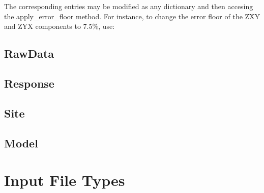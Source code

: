 \documentclass[letterpaper,10pt,english]{sphinxmanual}
\begin{document}
The corresponding entries may be modified as any dictionary and then accesing the apply\_error\_floor method. For instance, to change the error floor of the ZXY and ZYX components to 7.5\%, use:

\begin{sphinxVerbatim}[commandchars=\\\{\}]
\PYG{p}{[}\PYG{p}{]}  
\end{sphinxVerbatim}


\subsection{RawData}
\label{\detokenize{content/api_core/data_structures:rawdata}}\label{\detokenize{content/api_core/data_structures:id4}}

\subsection{Response}
\label{\detokenize{content/api_core/data_structures:response}}\label{\detokenize{content/api_core/data_structures:id5}}

\subsection{Site}
\label{\detokenize{content/api_core/data_structures:site}}\label{\detokenize{content/api_core/data_structures:id6}}

\subsection{Model}
\label{\detokenize{content/api_core/data_structures:model}}\label{\detokenize{content/api_core/data_structures:id7}}

\section{Input File Types}
\label{\detokenize{content/api_core/input_files:input-file-types}}\label{\detokenize{content/api_core/input_files::doc}}
\end{document}
